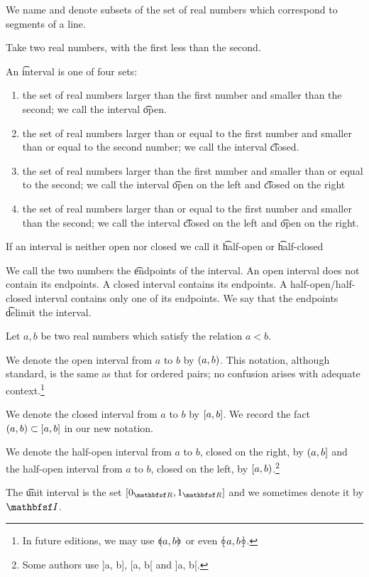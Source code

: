 

We name and denote subsets of the set of real numbers which correspond to segments of a line.


Take two real numbers, with the
first less than the second.

An
\t{interval}
is one of four sets:
\begin{enumerate}
  \item
  the set of real numbers larger
  than the first number and smaller
  than the second; we call the
  interval \t{open}.

  \item
  the set of real numbers larger than
  or equal to the first number and
  smaller than or equal to the second
  number; we call the interval
  \t{closed}.

  \item
  the set of real numbers larger
  than the first number and smaller
  than or equal to the second;
  we call the interval
  \t{open on the left}
  and
  \t{closed on the right}

  \item
  the set of real numbers larger
  than or equal to the first number
  and smaller than the second;
  we call the interval
  \t{closed on the left}
  and
  \t{open on the right}.
\end{enumerate}
If an interval is neither open
nor closed we call it
\t{half-open}
or
\t{half-closed}

We call the two numbers
the
\t{endpoints}
of the interval.
An open interval does not
contain its endpoints.
A closed interval contains
its endpoints.
A half-open/half-closed
interval contains only one
of its endpoints.
We say that the
endpoints
\t{delimit}
the interval.


Let $a, b$ be two real numbers
which satisfy the relation $a < b$.

We denote the open interval from
$a$ to $b$ by $(a, b)$.
This notation, although standard,
is the same as that for ordered pairs;
no confusion arises with adequate context.\footnote{In future editions, we may use $\circ\mskip-10mu\left(a, b\right)\mskip-10mu\circ$ or even $\circ\mskip-10mu\left[\,a, b\,\right]\mskip-10mu\circ$.}

We denote the closed interval from
$a$ to $b$ by $[a, b]$.
We record the fact
$(a, b) \subset [a, b]$
in our new notation.

We denote the half-open interval
from $a$ to $b$,
closed on the right, by $(a, b]$
and the half-open interval
from $a$ to $b$,
closed on the left, by $[a, b)$.\footnote{Some authors use ]a, b], [a, b[ and ]a, b[.}

The \t{unit interval} is the set $\ci{0_{\R}, 1_{\R}}$ and we sometimes denote it by $\I$.
